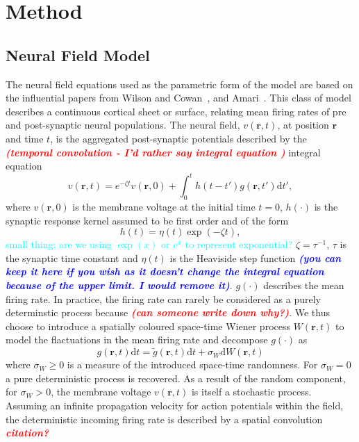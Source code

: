 \documentclass[]{article}
\newcommand{\dean}[1]{\textsf{\emph{\textbf{\textcolor{red}{#1}}}}}
\newcommand{\parham}[1]{\textsf{\emph{\textbf{\textcolor{blue}{#1}}}}}
\newcommand{\cyan}{\textcolor{cyan}}
\begin{document}
\section{Method}

\subsection{Neural Field Model}
The neural field equations used as the parametric form of the model are based on the influential papers from Wilson and Cowan~\cite{Wilson1973}, and Amari~\cite{Amari1977}. This class of model describes a continuous cortical sheet or surface, relating mean firing rates of pre and post-synaptic neural populations. The neural field, $v\left( {\mathbf{r},t} \right)$, at position $\mathbf{r}$ and time $t$, is the aggregated post-synaptic potentials described by the \dean{(temporal convolution - I'd rather say integral equation	)} integral equation 
\begin{equation}
	\label{SpikesToPotential} v\left( {\mathbf{r},t} \right) = e^{-\zeta t}v\left( {\mathbf{r},0} \right) + \int_{0}^t {h\left( {t - t'} \right)g\left( {\mathbf{r},t'} \right)\textrm{d}t'}, 
\end{equation}   
where $v\left( {\mathbf{r},0} \right)$ is the membrane voltage at the initial time $t = 0$, $h(\cdot)$ is the synaptic response kernel assumed to be first order and of the form 
\begin{equation}
	\label{SynapticRespKernel} h(t) = \eta(t)\exp{\left(-\zeta t\right)}, 
\end{equation}
\cyan{small thing: are we using $\exp(x)$ or $e^x$ to represent exponential?}
$\zeta=\tau^{-1}$, $\tau$ is the synaptic time constant and $\eta(t)$ is the Heaviside step function \parham{(you can keep it here if you wish as it doesn't change the integral equation because of the upper limit. I would remove it)}. $g(\cdot)$ describes the mean firing rate. In practice, the firing rate can rarely be considered as a purely determinstic process because \dean{(can someone write down why?)}. We thus choose to introduce a spatially coloured space-time Wiener process $W(\mathbf{r},t)$ to model the flactuations in the mean firing rate and decompose $g(\cdot)$ as
\begin{equation}\label{DecompositionOfg}
g(\mathbf{r},t)\textrm{d}t = \tilde{g}(\mathbf{r},t)\textrm{d}t + \sigma_W \textrm{d}W(\mathbf{r},t) 
\end{equation}
where $\sigma_W \ge 0$ is a measure of the introduced space-time randomness. For $\sigma_W = 0$ a pure deterministic process is recovered. As a result of the random component, for $\sigma_W > 0$, the membrane voltage $v(\mathbf{r},t)$ is itself a stochastic process. Assuming an infinite propagation velocity for action potentials within the field, the deterministic incoming firing rate is described by a spatial convolution \dean{citation?}
\end{document}
